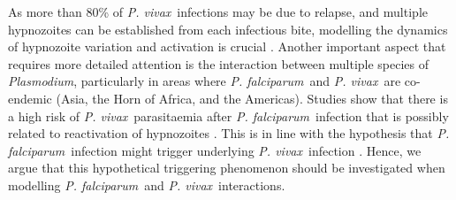 \documentclass[12pt]{article}
\newcommand{\pv}{\textit{P. vivax}}
\newcommand{\pf}{\textit{P. falciparum}}
\begin{document}
As more than 80\% of \pv~infections may be due to relapse, and multiple hypnozoites can be established from each infectious bite, modelling the dynamics of hypnozoite variation and activation is crucial \cite{mehra2022hypnozoite,anwar2022multiscale,robinson2015strategies}. Another important aspect that requires more detailed attention is the interaction between multiple species of \textit{Plasmodium}, particularly in areas where \pf~and \pv~are co-endemic (Asia, the Horn of Africa, and the Americas). Studies show that there is a high risk of \pv~parasitaemia after \pf~infection that is possibly related to reactivation of hypnozoites \cite{taylor_resolving_2019,hossain_risk_2020,commons_risk_2019}. This is in line with the hypothesis that \pf~infection might trigger underlying \pv~infection \cite{snounou2004co,white2011determinants,lin2011plasmodium,silal2019malaria}. Hence, we argue that this hypothetical triggering phenomenon should be investigated when modelling \pf~and \pv~interactions.
\end{document}

